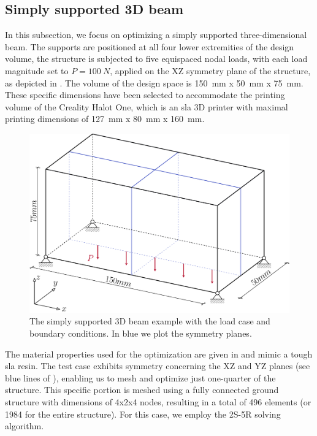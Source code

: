 \subsection{Simply supported 3D beam} \label{sec:04_simply_supp}
In this subsection, we focus on optimizing a simply supported three-dimensional beam. The supports are positioned at all four lower extremities of the design volume, the structure is subjected to five equispaced nodal loads, with each load magnitude set to $P=\qty{100}{N}$, applied on the XZ symmetry plane of the structure, as depicted in . The volume of the design space is \qty{150}{mm} x \qty{50}{mm} x \qty{75}{mm}. These specific dimensions have been selected to accommodate the printing volume of the Creality Halot One, which is an \gls{sla} 3D printer with maximal printing dimensions of \qty{127}{mm} x \qty{80}{mm} x \qty{160}{mm}.
\begin{figure}
    \centering
    \includegraphics[width=0.8\linewidth]{figures/04_TTO_improvements/14_supported_3D_BCs/supported_3D.pdf}
    \caption{The simply supported 3D beam example with the load case and boundary conditions. In blue we plot the symmetry planes.}
    \label{fig:04_simply3D_BC}
\end{figure}
The material properties used for the optimization are given in  and mimic a tough \gls{sla} resin. The test case exhibits symmetry concerning the XZ and YZ planes (see blue lines of ), enabling us to mesh and optimize just one-quarter of the structure. This specific portion is meshed using a fully connected ground structure with dimensions of 4x2x4 nodes, resulting in a total of 496 elements (or 1984 for the entire structure). For this case, we employ the 2S-5R solving algorithm.

